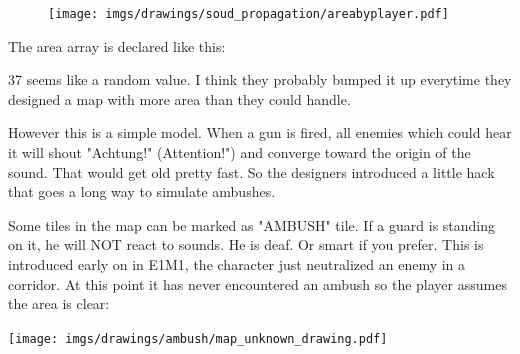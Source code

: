 \par
\begin{figure}[H]
 \centering
 \texttt{[image: imgs/drawings/soud\_propagation/areabyplayer.pdf]}
\end{figure}
\par
The area array is declared like this:\\
\par
\begin{minipage}{\textwidth}

\end{minipage}
\par
37 seems like a random value. I think they probably bumped it up everytime they designed a map with more area than they could handle.\\
\par








However this is a simple model. When a gun is fired, all enemies which could hear it will shout "Achtung!" (Attention!") and converge toward the origin of the sound. That would get old pretty fast. So the designers introduced a little hack that goes a long way to simulate ambushes.


\par
\begin{minipage}{1\textwidth}
\begin{figure}[H]
 \centering
\end{figure}
\par


  \begin{minipage}{0.6\textwidth}
  Some tiles in the map can be marked as "AMBUSH" tile. If a guard is standing on it, he will NOT react to sounds. He is deaf. Or smart if you prefer. This is introduced early on in E1M1, the character just neutralized an enemy in a corridor. At this point it has never encountered an ambush so the player assumes the area is clear:\\
  \end{minipage}
  \begin{minipage}{0.4\textwidth}
  \begin{flushright}
  \texttt{[image: imgs/drawings/ambush/map\_unknown\_drawing.pdf]}
  \end{flushright}  
  \end{minipage}
\end{minipage}
\noindent
\\


